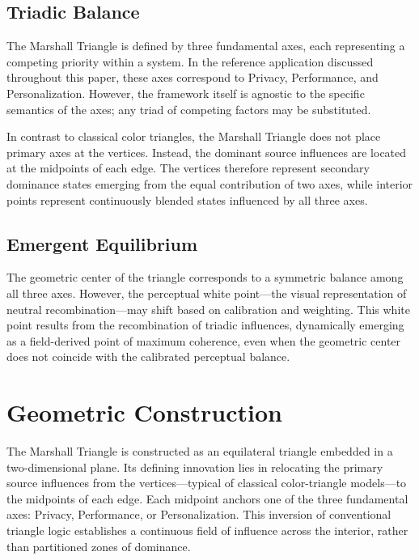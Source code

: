 \documentclass[preprints,article,submit,pdftex,oneauthor]{Definitions/mdpi}
\begin{document}
\subsection{Triadic Balance}

The Marshall Triangle is defined by three fundamental axes, each representing a competing priority within a system. In the reference application discussed throughout this paper, these axes correspond to Privacy, Performance, and Personalization. However, the framework itself is agnostic to the specific semantics of the axes; any triad of competing factors may be substituted.

In contrast to classical color triangles, the Marshall Triangle does not place primary axes at the vertices. Instead, the dominant source influences are located at the midpoints of each edge. The vertices therefore represent secondary dominance states emerging from the equal contribution of two axes, while interior points represent continuously blended states influenced by all three axes.

\subsection{Emergent Equilibrium}

The geometric center of the triangle corresponds to a symmetric balance among all three axes. However, the perceptual white point---the visual representation of neutral recombination---may shift based on calibration and weighting. This white point results from the recombination of triadic influences, dynamically emerging as a field-derived point of maximum coherence, even when the geometric center does not coincide with the calibrated perceptual balance.

\section{Geometric Construction}

The Marshall Triangle is constructed as an equilateral triangle embedded in a two-dimensional plane. Its defining innovation lies in relocating the primary source influences from the vertices---typical of classical color-triangle models---to the midpoints of each edge. Each midpoint anchors one of the three fundamental axes: Privacy, Performance, or Personalization. This inversion of conventional triangle logic establishes a continuous field of influence across the interior, rather than partitioned zones of dominance.
\end{document}
